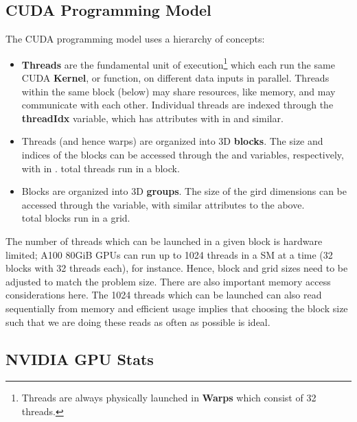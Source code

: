 \documentclass[11pt]{article}
\begin{document}
\subsection{CUDA Programming Model}

The CUDA programming model uses a hierarchy of concepts:
\begin{itemize}
    \item \textbf{Threads}  are the fundamental unit of execution\footnote{Threads are always
        physically launched in \textbf{Warps} which consist of 32 threads.} which each run the same
        CUDA \textbf{Kernel}, or function, on different data inputs in parallel. Threads within the
        same block (below) may share resources, like memory, and may communicate with each other.
        Individual threads are indexed through the \textbf{threadIdx} variable, which has
         attributes with  in
         and similar.

	\item Threads (and hence warps) are organized into 3D \textbf{blocks}. The size and indices of
	      the blocks can be accessed through the  and 
	      variables, respectively, with  in .
	       total threads run in a block.
	\item Blocks are organized into 3D \textbf{groups}. The size of the gird dimensions can be
	      accessed through the  variable, with similar attributes to the above. \\
	       total blocks run in a grid.
\end{itemize}

The number of threads which can be launched in a given block is hardware limited; A100 80GiB GPUs
can run up to 1024 threads in a SM at a time (32 blocks with 32 threads each), for instance. Hence,
block and grid sizes need to be adjusted to match the problem size. There are also important memory
access considerations here. The 1024 threads which can be launched can also read sequentially from
memory and efficient usage implies that choosing the block size such that we are doing these reads
as often as possible is ideal.

\subsection{NVIDIA GPU Stats \label{app_gpu_stats}}
\end{document}
